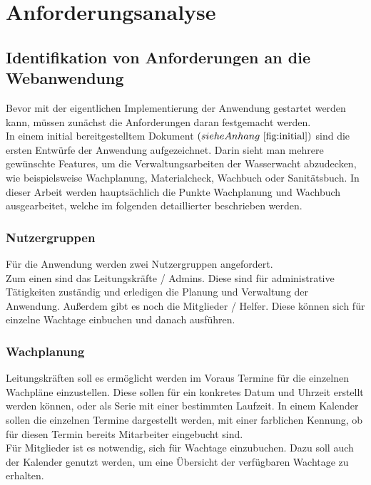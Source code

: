 \documentclass[fontsize=12pt,openright,oneside,paper=a4,BCOR=1cm]{scrbook}
\begin{document}

%
%

\chapter{Anforderungsanalyse}
\section{Identifikation von Anforderungen an die Webanwendung} 
Bevor mit der eigentlichen Implementierung der Anwendung gestartet werden kann, müssen zunächst die Anforderungen daran festgemacht werden. \\
In einem initial bereitgestelltem Dokument $(siehe Anhang ~\ref{fig:initial})$ sind die ersten Entwürfe der Anwendung aufgezeichnet. Darin sieht man mehrere gewünschte Features, um die Verwaltungsarbeiten der Wasserwacht abzudecken, wie beispielsweise \glqq Wachplanung\grqq{}, \glqq Materialcheck\grqq{}, \glqq Wachbuch\grqq{} oder \glqq Sanitätsbuch\grqq{}. In dieser Arbeit werden hauptsächlich die Punkte \glqq Wachplanung\grqq{} und \glqq Wachbuch\grqq{} ausgearbeitet, welche im folgenden detaillierter beschrieben werden. 

\subsection{Nutzergruppen}
Für die Anwendung werden zwei Nutzergruppen angefordert. \\
Zum einen sind das \glqq Leitungskräfte / Admins\grqq{}. Diese sind für administrative Tätigkeiten zuständig und erledigen die Planung und Verwaltung der Anwendung. 
Außerdem gibt es noch die \glqq Mitglieder / Helfer\grqq{}. Diese können sich für einzelne Wachtage einbuchen und danach ausführen.

\subsection{Wachplanung}
Leitungskräften soll es ermöglicht werden im Voraus Termine für die einzelnen Wachpläne einzustellen. Diese sollen für ein konkretes Datum und Uhrzeit erstellt werden können, oder als Serie mit einer bestimmten Laufzeit. In einem Kalender sollen die einzelnen Termine dargestellt werden, mit einer farblichen Kennung, ob für diesen Termin bereits Mitarbeiter eingebucht sind. \\
Für Mitglieder ist es notwendig, sich für Wachtage einzubuchen. Dazu soll auch der Kalender genutzt werden, um eine Übersicht der verfügbaren Wachtage zu erhalten.
\end{document}
